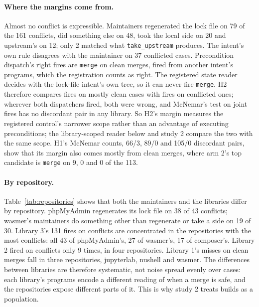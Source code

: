 \documentclass[11pt]{article}
\newcommand{\code}[1]{\texttt{#1}}
\begin{document}
\paragraph{Where the margins come from.}
Almost no conflict is expressible. Maintainers regenerated the lock file on 79 of the 161
conflicts, did something else on 48, took the local side on 20 and upstream's on 12; only 2
matched what \code{take\_upstream} produces. The intent's own rule disagrees with the maintainer on
37 conflicted cases. Precondition dispatch's right fires are \code{merge} on clean merges, fired
from another intent's programs, which the registration counts as right. The registered state
reader decides with the lock-file intent's own tree, so it can never fire \code{merge}. H2
therefore compares fires on mostly clean cases with fires on conflicted ones; wherever both
dispatchers fired, both were wrong, and McNemar's test on joint fires has no discordant pair in
any library. So H2's margin measures the registered control's narrower scope rather than an
advantage of executing preconditions; the library-scoped reader below and study 2 compare the two
with the same scope. H1's McNemar counts, 66/3, 89/0 and 105/0 discordant pairs, show that its
margin also comes mostly from clean merges, where arm 2's top candidate is \code{merge} on 9, 0
and 0 of the 113.

\begin{table}[t]
\centering
\caption{Stage B by repository: how maintainers resolved the conflicts (``upstream-like'' is
took upstream's file or matched a line-union resolution), and precondition dispatch's fires on
conflicts and right fires on clean merges, per library (1 / 2 / 3).}
\label{tab:repositories}
\small
\setlength{\tabcolsep}{3pt}
\resizebox{\linewidth}{!}{}
\end{table}

\paragraph{By repository.}
Table~\ref{tab:repositories} shows that both the maintainers and the libraries differ by
repository. phpMyAdmin regenerates its lock file on 38 of 43 conflicts; wasmer's maintainers do
something other than regenerate or take a side on 19 of 30. Library 3's 131 fires on conflicts
are concentrated in the repositories with the most conflicts: all 43 of phpMyAdmin's, 27 of
wasmer's, 17 of composer's. Library 2 fired on conflicts only 9 times, in four repositories.
Library 1's misses on clean merges fall in three repositories, jupyterlab, nushell and wasmer. The
differences between libraries are therefore systematic, not noise spread evenly over cases: each
library's programs encode a different reading of when a merge is safe, and the repositories
expose different parts of it. This is why study 2 treats builds as a population.
\end{document}
